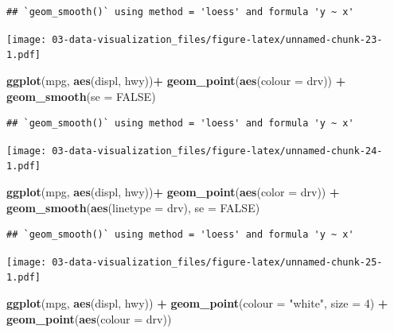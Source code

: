 \documentclass[]{book}
\newenvironment{Shaded}{\begin{snugshade}}{\end{snugshade}}
\newcommand{\DataTypeTok}[1]{\textcolor[rgb]{0.13,0.29,0.53}{#1}}
\newcommand{\DecValTok}[1]{\textcolor[rgb]{0.00,0.00,0.81}{#1}}
\newcommand{\KeywordTok}[1]{\textcolor[rgb]{0.13,0.29,0.53}{\textbf{#1}}}
\newcommand{\NormalTok}[1]{#1}
\newcommand{\OperatorTok}[1]{\textcolor[rgb]{0.81,0.36,0.00}{\textbf{#1}}}
\newcommand{\OtherTok}[1]{\textcolor[rgb]{0.56,0.35,0.01}{#1}}
\newcommand{\StringTok}[1]{\textcolor[rgb]{0.31,0.60,0.02}{#1}}
\theoremstyle{definition}
\theoremstyle{definition}
\theoremstyle{definition}
\theoremstyle{remark}
\begin{document}
\begin{verbatim}
## `geom_smooth()` using method = 'loess' and formula 'y ~ x'
\end{verbatim}

\texttt{[image: 03-data-visualization\_files/figure-latex/unnamed-chunk-23-1.pdf]}

\begin{Shaded}
\begin{Highlighting}[]
\KeywordTok{ggplot}\NormalTok{(mpg, }\KeywordTok{aes}\NormalTok{(displ, hwy))}\OperatorTok{+}
\StringTok{  }\KeywordTok{geom_point}\NormalTok{(}\KeywordTok{aes}\NormalTok{(}\DataTypeTok{colour =}\NormalTok{ drv)) }\OperatorTok{+}
\StringTok{  }\KeywordTok{geom_smooth}\NormalTok{(}\DataTypeTok{se =} \OtherTok{FALSE}\NormalTok{)}
\end{Highlighting}
\end{Shaded}

\begin{verbatim}
## `geom_smooth()` using method = 'loess' and formula 'y ~ x'
\end{verbatim}

\texttt{[image: 03-data-visualization\_files/figure-latex/unnamed-chunk-24-1.pdf]}

\begin{Shaded}
\begin{Highlighting}[]
\KeywordTok{ggplot}\NormalTok{(mpg, }\KeywordTok{aes}\NormalTok{(displ, hwy))}\OperatorTok{+}
\StringTok{  }\KeywordTok{geom_point}\NormalTok{(}\KeywordTok{aes}\NormalTok{(}\DataTypeTok{color =}\NormalTok{ drv)) }\OperatorTok{+}
\StringTok{  }\KeywordTok{geom_smooth}\NormalTok{(}\KeywordTok{aes}\NormalTok{(}\DataTypeTok{linetype =}\NormalTok{ drv), }\DataTypeTok{se =} \OtherTok{FALSE}\NormalTok{)}
\end{Highlighting}
\end{Shaded}

\begin{verbatim}
## `geom_smooth()` using method = 'loess' and formula 'y ~ x'
\end{verbatim}

\texttt{[image: 03-data-visualization\_files/figure-latex/unnamed-chunk-25-1.pdf]}

\begin{Shaded}
\begin{Highlighting}[]
\KeywordTok{ggplot}\NormalTok{(mpg, }\KeywordTok{aes}\NormalTok{(displ, hwy)) }\OperatorTok{+}
\StringTok{  }\KeywordTok{geom_point}\NormalTok{(}\DataTypeTok{colour =} \StringTok{"white"}\NormalTok{, }\DataTypeTok{size =} \DecValTok{4}\NormalTok{) }\OperatorTok{+}
\StringTok{  }\KeywordTok{geom_point}\NormalTok{(}\KeywordTok{aes}\NormalTok{(}\DataTypeTok{colour =}\NormalTok{ drv))}
\end{Highlighting}
\end{Shaded}
\end{document}
